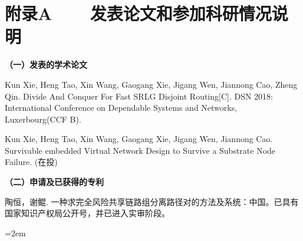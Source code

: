 
\chapter*{附录A~~~~发表论文和参加科研情况说明}
\setlength{\parindent}{0em}
\textbf{（一）发表的学术论文}
\begin{publist}
\item Kun Xie, Heng Tao, Xin Wang, Gaogang Xie, Jigang Wen, Jiannong Cao, Zheng Qin. Divide And Conquer For Fast SRLG Disjoint Routing[C]. DSN 2018: International Conference on Dependable Systems and Networks, Luxerbourg(CCF B).
\item Kun Xie, Heng Tao, Xin Wang, Gaogang Xie, Jigang Wen, Jiannong Cao. Survivable embedded Virtual Network Design to Survive a Substrate Node Failure. (在投)
\end{publist}

\vspace*{1em}
\textbf{（二）申请及已获得的专利}
\begin{publist}
\item 陶恒，谢鲲. 一种求完全风险共享链路组分离路径对的方法及系统：中国。已具有国家知识产权局公开号，并已进入实审阶段。
\end{publist}
\vfill
{}\hangindent=2em\noindent

\setlength{\parindent}{2em}
